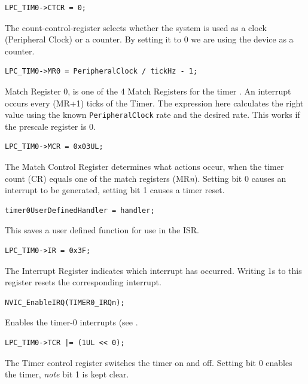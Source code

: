 \documentclass[a4paper]{tufte-handout}
\begin{document}
\begin{verbatim}
LPC_TIM0->CTCR = 0;
\end{verbatim}
The count-control-register \citep[24.6.11]{lpc4088} selects whether the
system is used as a clock (Peripheral Clock) or a counter.  By setting
it to 0 we are using the device as a counter.

\begin{verbatim}
LPC_TIM0->MR0 = PeripheralClock / tickHz - 1;
\end{verbatim}
Match Register 0, is one of the 4 Match Registers for the timer
\citep[24.6.7]{lpc4088}.  An interrupt occurs every (MR+1) ticks of
the Timer.  The expression here calculates the right value using the
known \texttt{PeripheralClock} rate and the desired rate.  This works
if the prescale register is 0.

\begin{verbatim}
LPC_TIM0->MCR = 0x03UL;
\end{verbatim}
The Match Control Register \citep[24.6.6]{lpc4088} determines what
actions occur, when the timer count (CR) equals one of the match
registers (MR\textit{n}).  Setting bit 0 causes an interrupt to be
generated, setting bit 1 causes a timer reset.

\begin{verbatim}
timer0UserDefinedHandler = handler;
\end{verbatim}
This saves a user defined function for use in the ISR.

\begin{verbatim}
LPC_TIM0->IR = 0x3F;
\end{verbatim}
The Interrupt Register \citep[24.6.1]{lpc4088} indicates which
interrupt has occurred.  Writing 1s to this register resets the
corresponding interrupt.

\begin{verbatim}
NVIC_EnableIRQ(TIMER0_IRQn);
\end{verbatim}
Enables the timer-0 interrupts (see \citep[Chapter 5]{lpc4088}.

\begin{verbatim}
LPC_TIM0->TCR |= (1UL << 0);
\end{verbatim}
The Timer control register \citep[24.6.2]{lpc4088} switches the timer
on and off.  Setting bit 0 enables the timer,  \emph{note} bit 1 is
kept clear.
\end{document}
